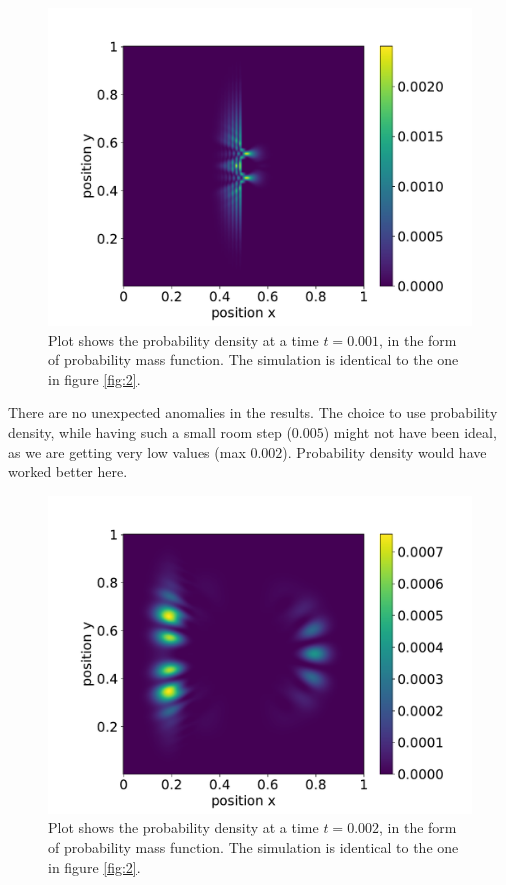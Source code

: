 \documentclass[english,notitlepage,reprint,nofootinbib]{revtex4-1}  %
\begin{document}
\begin{figure}[h!]
    \centering %
    \includegraphics[scale=0.37]{figures/contur_P_2_12T.pdf} %
    \caption{Plot shows the probability density at a time $t=0.001$, in the form of probability mass function. The simulation is identical to the one in figure \ref{fig:2}.}
    \label{fig:3}
\end{figure}
\FloatBarrier

There are no unexpected anomalies in the results. The choice to use probability density, while having such a small room step ($0.005$) might not have been ideal, as we are getting very low values (max $0.002$). Probability density would have worked better here.


\begin{figure}[h!]
    \centering %
    \includegraphics[scale=0.4]{figures/contur_P_2_T.pdf} %
    \caption{Plot shows the probability density at a time $t=0.002$, in the form of probability mass function. The simulation is identical to the one in figure \ref{fig:2}.}
    \label{fig:4}
\end{figure}
\FloatBarrier
\end{document}
